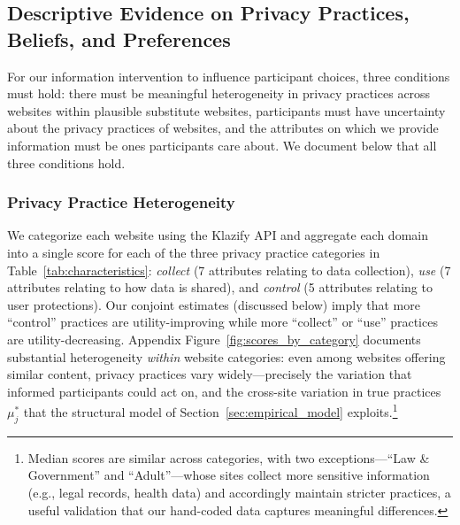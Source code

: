 \documentclass[12pt]{article}
\theoremstyle{definition}
\theoremstyle{remark}
\begin{document}
\subsection{Descriptive Evidence on Privacy Practices, Beliefs, and Preferences}\label{sec:privacy_practices_online}

For our information intervention to influence participant choices, three conditions must hold: there must be meaningful heterogeneity in privacy practices across websites within plausible substitute websites, participants must have uncertainty about the privacy practices of websites, and the attributes on which we provide information must be ones participants care about. We document below that all three conditions hold.

\subsubsection{Privacy Practice Heterogeneity}
We categorize each website using the Klazify API and aggregate each domain into a single score for each of the three privacy practice categories in Table~\ref{tab:characteristics}: \emph{collect} (7 attributes relating to data collection), \emph{use} (7 attributes relating to how data is shared), and \emph{control} (5 attributes relating to user protections). Our conjoint estimates (discussed below) imply that more ``control'' practices are utility-improving while more ``collect'' or ``use'' practices are utility-decreasing. Appendix Figure~\ref{fig:scores_by_category} documents substantial heterogeneity \emph{within} website categories: even among websites offering similar content, privacy practices vary widely---precisely the variation that informed participants could act on, and the cross-site variation in true practices $\mu^*_j$ that the structural model of Section~\ref{sec:empirical_model} exploits.\footnote{Median scores are similar across categories, with two exceptions---``Law \& Government'' and ``Adult''---whose sites collect more sensitive information (e.g., legal records, health data) and accordingly maintain stricter practices, a useful validation that our hand-coded data captures meaningful differences.}
\end{document}
